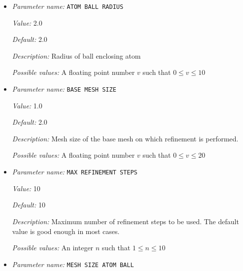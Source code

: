 \begin{itemize}
\item {\it Parameter name:} {\tt ATOM BALL RADIUS}
\label{parameters:Finite element mesh parameters/Auto mesh generation parameters/ATOM BALL RADIUS}
\label{parameters:Finite_20element_20mesh_20parameters/Auto_20mesh_20generation_20parameters/ATOM_20BALL_20RADIUS}


{\it Value:} 2.0


{\it Default:} 2.0


{\it Description:} Radius of ball enclosing atom


{\it Possible values:} A floating point number $v$ such that $0 \leq v \leq 10$
\item {\it Parameter name:} {\tt BASE MESH SIZE}
\label{parameters:Finite element mesh parameters/Auto mesh generation parameters/BASE MESH SIZE}
\label{parameters:Finite_20element_20mesh_20parameters/Auto_20mesh_20generation_20parameters/BASE_20MESH_20SIZE}


{\it Value:} 1.0


{\it Default:} 2.0


{\it Description:} Mesh size of the base mesh on which refinement is performed.


{\it Possible values:} A floating point number $v$ such that $0 \leq v \leq 20$
\item {\it Parameter name:} {\tt MAX REFINEMENT STEPS}
\label{parameters:Finite element mesh parameters/Auto mesh generation parameters/MAX REFINEMENT STEPS}
\label{parameters:Finite_20element_20mesh_20parameters/Auto_20mesh_20generation_20parameters/MAX_20REFINEMENT_20STEPS}


{\it Value:} 10


{\it Default:} 10


{\it Description:} Maximum number of refinement steps to be used. The default value is good enough in most cases.


{\it Possible values:} An integer $n$ such that $1\leq n \leq 10$
\item {\it Parameter name:} {\tt MESH SIZE ATOM BALL}
\label{parameters:Finite element mesh parameters/Auto mesh generation parameters/MESH SIZE ATOM BALL}
\label{parameters:Finite_20element_20mesh_20parameters/Auto_20mesh_20generation_20parameters/MESH_20SIZE_20ATOM_20BALL}



\end{itemize}

